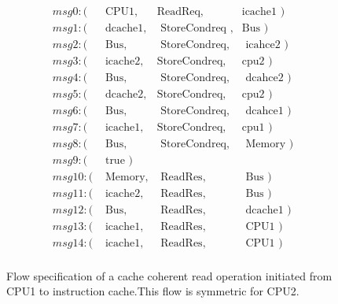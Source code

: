 \documentclass[conference]{IEEEtran}
\begin{document}
\begin{figure}
 {\footnotesize
 \[
 \begin{array}{llll}
 msg0: (&\mbox{ CPU1},&\mbox{ReadReq},&\mbox{icache1  })\\                   
 msg1: (&\mbox{ dcache1},&\mbox{ StoreCondreq },&\mbox{Bus })\\           
 msg2: (&\mbox{ Bus},&\mbox{ StoreCondreq},&\mbox{ icahce2 })\\
 msg3: (&\mbox{ icache2},&\mbox{StoreCondreq},&\mbox{cpu2       })\\      
 msg4: (&\mbox{ Bus},&\mbox{ StoreCondreq},&\mbox{ dcahce2           })\\ 
 msg5: (&\mbox{ dcache2},&\mbox{StoreCondreq},&\mbox{cpu2 })\\
 msg6: (&\mbox{ Bus},&\mbox{ StoreCondreq},&\mbox{ dcahce1     })\\       
 msg7: (&\mbox{ icache1},&\mbox{StoreCondreq},&\mbox{cpu1           })\\ 
 msg8: (&\mbox{ Bus},&\mbox{ StoreCondreq},&\mbox{ Memory })\\
 msg9: (&\mbox{ true                                        })\\
 msg10: (&\mbox{ Memory},&\mbox{ ReadRes},&\mbox{ Bus            })\\    
 msg11: (&\mbox{ icache2},&\mbox{ ReadRes},&\mbox{ Bus })\\
 msg12: (&\mbox{ Bus},&\mbox{ ReadRes},&\mbox{ dcache1      })\\            
 msg13: (&\mbox{ icache1},&\mbox{ ReadRes},&\mbox{ CPU1          })\\  
 msg14: (&\mbox{ icache1},&\mbox{ ReadRes},&\mbox{ CPU1 })\\
 \end{array}
 \]}
 \caption{Flow specification of a cache coherent read operation initiated from CPU1 to instruction cache.This flow is symmetric for CPU2. }
 \label{read-flow}
 
 \end{figure}
 
 
\end{document}
